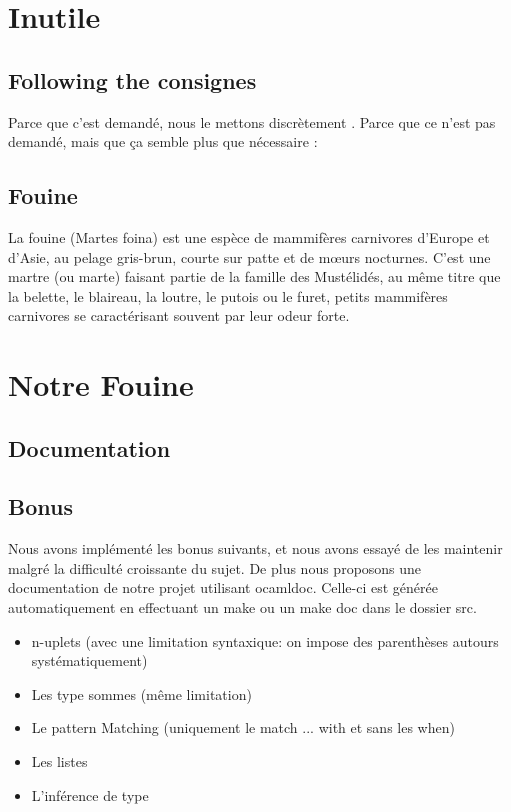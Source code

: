 \documentclass{article}
\begin{document}
	\section{Inutile}
	\subsection{Following the consignes}
	Parce que c'est demandé, nous le mettons discrètement \cite{Landin:1966:NPL:365230.365257}. Parce que ce n'est pas demandé, mais que ça semble plus que nécessaire : 
	
	\subsection{Fouine}
	La fouine (Martes foina) est une espèce de mammifères carnivores d'Europe et d'Asie, au pelage gris-brun, courte sur patte et de mœurs nocturnes. C'est une martre (ou marte) faisant partie de la famille des Mustélidés, au même titre que la belette, le blaireau, la loutre, le putois ou le furet, petits mammifères carnivores se caractérisant souvent par leur odeur forte.\cite{wiki:Fouine}
	
	\section{Notre Fouine}
	
	\subsection{Documentation}
	
	\subsection{Bonus}
	
	Nous avons implémenté les bonus suivants, et nous avons essayé de les maintenir malgré la difficulté croissante du sujet. De plus nous proposons une documentation de notre projet utilisant ocamldoc. Celle-ci est générée automatiquement en effectuant un make ou un make doc dans le dossier src.
	
	\begin{itemize}
		\item n-uplets (avec une limitation syntaxique: on impose des parenthèses autours systématiquement)
		\item Les type sommes (même limitation)
		\item Le pattern Matching (uniquement le match ... with et sans les when)
		\item Les listes
		\item L'inférence de type
	\end{itemize}
\end{document}
